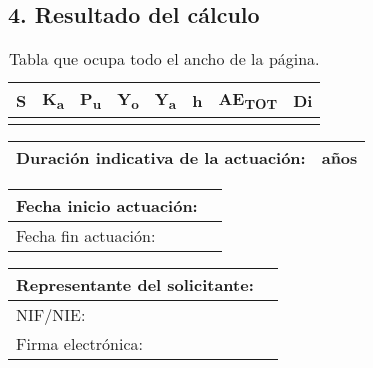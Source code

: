 \documentclass[12pt]{article}
\let\OldTextField\TextField
\renewcommand{\TextField}[2][]{%
  \OldTextField[height=1.1em, bordercolor={1 1 1}, borderwidth=0, backgroundcolor={1 1 1 0}, #1]{#2}%
}
\begin{document}
\begin{Form}
\section*{4. Resultado del cálculo}

\begin{table}[h!]
    \centering
    \begin{tabular}{|p{1cm}|p{1.5cm}|p{1.5cm}|p{1.5cm}|p{1.5cm}|p{1.5cm}|p{1.5cm}|p{1.5cm}|}
    \hline
    \textbf{S} & \textbf{K\textsubscript{a}} & \textbf{P\textsubscript{u}} & \textbf{Y\textsubscript{o}} & \textbf{Y\textsubscript{a}} & \textbf{h} & \textbf{AE\textsubscript{TOT}} & \textbf{Di} \\ \hline
    \TextField[name=S,width=1.5cm]{} & \TextField[name=K_a,width=1.5cm]{} & \TextField[name=P_u,width=1.5cm]{} & \TextField[name=Y_o,width=1.5cm]{} & \TextField[name=Y_a,width=1.5cm]{} & \TextField[name=h,width=1.5cm]{} & \TextField[name=AE_TOT,width=1.5cm]{} & \TextField[name=Di,width=1.5cm]{} \\ \hline
    \end{tabular}
    \caption{Tabla que ocupa todo el ancho de la página.}
\end{table}

\begin{table}[h!]
    \centering
    \begin{tabular}{|p{11cm}|p{4cm}|}
    \hline
    Duración indicativa de la actuación: & \hspace{2cm} años \\ \hline
    \end{tabular}
\end{table}

\begin{table}[h!]
    \centering
    \begin{tabular}{|p{5cm}|p{10cm}|}
    \hline
    Fecha inicio actuación: & \hspace{3cm} \\ \hline
    Fecha fin actuación: & \hspace{3cm} \\ \hline
    \end{tabular}
\end{table}

\begin{table}[h!]
    \centering
    \begin{tabular}{|p{5cm}|p{10cm}|}
    \hline
    Representante del solicitante: & \hspace{3cm} \\ \hline
    NIF/NIE: & \hspace{3cm} \\ \hline
    Firma electrónica: & \hspace{3cm} \\ \hline
    \end{tabular}
\end{table}


\end{Form}
\end{document}
